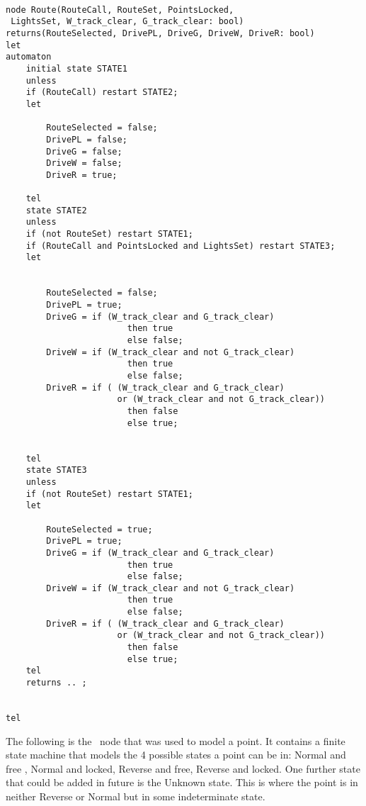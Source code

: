\begin{verbatim}

node Route(RouteCall, RouteSet, PointsLocked,
 LightsSet, W_track_clear, G_track_clear: bool)
returns(RouteSelected, DrivePL, DriveG, DriveW, DriveR: bool) 
let
automaton
	initial state STATE1
	unless
	if (RouteCall) restart STATE2;
	let
	
		RouteSelected = false;
		DrivePL = false;
		DriveG = false;
		DriveW = false;
		DriveR = true;
	
	tel
	state STATE2
	unless
	if (not RouteSet) restart STATE1;
	if (RouteCall and PointsLocked and LightsSet) restart STATE3;
	let
	
	
		RouteSelected = false; 
		DrivePL = true;
		DriveG = if (W_track_clear and G_track_clear)
						then true
						else false;
		DriveW = if (W_track_clear and not G_track_clear)	
						then true
						else false;
		DriveR = if ( (W_track_clear and G_track_clear) 
                      or (W_track_clear and not G_track_clear))
						then false
						else true;
						
	
	tel
	state STATE3
	unless
	if (not RouteSet) restart STATE1;
	let
	
		RouteSelected = true;
		DrivePL = true;
		DriveG = if (W_track_clear and G_track_clear)
						then true
						else false;
		DriveW = if (W_track_clear and not G_track_clear)	
						then true
						else false;
		DriveR = if ( (W_track_clear and G_track_clear) 
                      or (W_track_clear and not G_track_clear))
						then false
						else true;
	tel
	returns .. ;
	

tel

\end{verbatim}

The following is the \scade \ node that was used to model a point. It contains a
finite state machine that models the 4 possible states a point can be
in: Normal and free , Normal and locked, Reverse and free, Reverse and
locked. One further state that could be added in future is the Unknown
state. This is where the point is in neither Reverse or Normal but in some
indeterminate state. 

